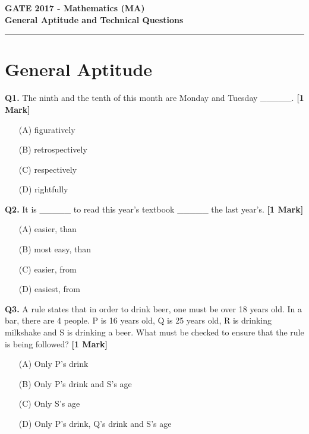 \documentclass[11pt]{article}
\newcommand{\questiona}[2]{
    \noindent\textbf{Q#2.} #1 \hfill \textbf{[1 Mark]}
}
\begin{document}
\begin{center}
    \Large\textbf{GATE 2017 - Mathematics (MA)} \\
    \large\textbf{General Aptitude and Technical Questions} \\
    \rule{\textwidth}{0.5pt} %
\end{center}

\vspace{0.5cm}

\section*{General Aptitude}

\questiona{The ninth and the tenth of this month are Monday and Tuesday \_\_\_\_\_.}{1}
\begin{enumerate}
    \item[(A)] figuratively  
    \item[(B)] retrospectively  
    \item[(C)] respectively  
    \item[(D)] rightfully  
\end{enumerate}
\vspace{0.5cm}

\questiona{It is \_\_\_\_\_ to read this year's textbook \_\_\_\_\_ the last year's.}{2}
\begin{enumerate}
    \item[(A)] easier, than  
    \item[(B)] most easy, than  
    \item[(C)] easier, from  
    \item[(D)] easiest, from  
\end{enumerate}
\vspace{0.5cm}

\questiona{A rule states that in order to drink beer, one must be over 18 years old. In a bar, there are 4 people. P is 16 years old, Q is 25 years old, R is drinking milkshake and S is drinking a beer. What must be checked to ensure that the rule is being followed?}{3}
\begin{enumerate}
    \item[(A)] Only P's drink  
    \item[(B)] Only P's drink and S's age  
    \item[(C)] Only S's age  
    \item[(D)] Only P's drink, Q's drink and S's age  
\end{enumerate}
\vspace{0.5cm}
\end{document}
